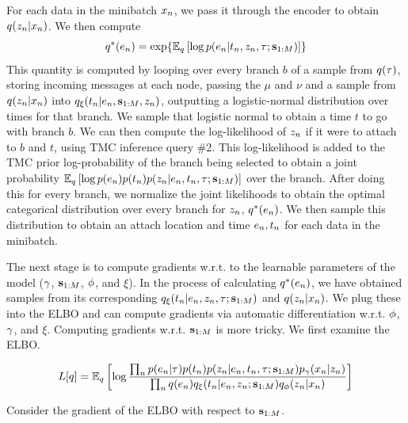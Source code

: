 For each data in the minibatch $x_n$, we pass it
through the encoder to obtain $q(z_n | x_n)$.
We then compute
\begin{equation}
    q^*(e_\n) = \exp{\E_\q\left[\log \p(e_\n | t_\n, \z_\n, \tree; \inducingpoints)\right]}
\end{equation}
This quantity is computed by looping
over every branch $b$ of 
a sample from $q(\tau)$,
storing incoming messages at each node,
passing the $\mu$ and $\nu$
and a sample from $q(z_n | x_n)$
into $q_\xi(t_n | e_n, \mathbf{s}_{1:M}, z_n)$,
outputting a logistic-normal distribution
over times for that branch. We sample that
logistic normal to obtain a time $t$
to go with branch $b$. We can then compute
the log-likelihood of $z_n$ if it were
to attach to $b$ and $t$, using TMC
inference query \#2.
This log-likelihood is added to the TMC prior log-probability
of the branch being selected to obtain
a joint probability $\mathbb{E}_q\left[\log p(e_n)p(t_n)p(z_n | e_n, t_n, \tau; \mathbf{s}_{1:M})\right]$ over the branch.
After doing this for every branch, we normalize
the joint likelihoods to obtain
the optimal categorical distribution over every branch
for $z_n$, $q^*(e_n)$. We then sample this
distribution to obtain an attach location and time
$e_n, t_n$ for each data in the minibatch.

The next stage is to compute gradients w.r.t. to the
learnable parameters of the model ($\gamma$, $\mathbf{s}_{1:M}$, $\phi$, and $\xi$).
In the process of calculating $q^*(e_n)$,
we have obtained samples from its corresponding 
$q_\xi(t_n | e_n, z_n, \tau; \mathbf{s}_{1:M})$ and $q(z_n | x_n)$.
We plug these into the ELBO and can compute
gradients via automatic differentiation w.r.t. $\phi$,
$\gamma$, and $\xi$. Computing gradients w.r.t.
$\mathbf{s}_{1:M}$ is more tricky. We first examine the ELBO.

\begin{equation}
    L[q] = \mathbb{E}_q \left[\log \frac{\prod_n p(e_n|\tau) p(t_n) p(z_n | e_n, t_n, \tau; \mathbf{s}_{1:M})p_\gamma(x_n | z_n)}{\prod_n q(e_n)q_{\xi}(t_n | e_n, z_n; \mathbf{s}_{1:M})q_\phi(z_n | x_n)}\right]
\end{equation}

Consider the gradient of the ELBO with respect to $\mathbf{s}_{1:M}$.

